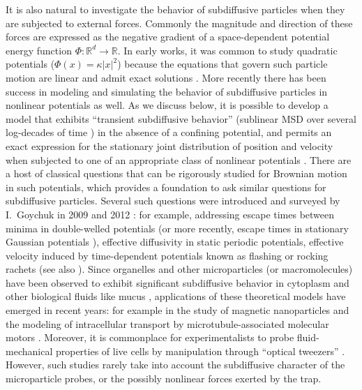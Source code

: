 \documentclass[11pt]{amsart}
\theoremstyle{definition}
\theoremstyle{definition}
\theoremstyle{plain}
\numberwithin{equation}{section}
\begin{document}
It is also natural to investigate the behavior of subdiffusive particles when they are subjected to external forces. Commonly the magnitude and direction of these forces are expressed as the negative gradient of a space-dependent potential energy function $\Phi : \mathbb{R}^d \to \mathbb{R}$. In early works, it was common to study quadratic potentials ($\Phi(x) = \kappa |x|^2$)  because the equations that govern such particle motion are linear and admit exact solutions \cite{adelman1976fokker,kupferman2004fractional,kou2004general}. More recently there has been success in modeling and simulating the behavior of subdiffusive particles in nonlinear potentials as well. As we discuss below, it is possible to develop a model that exhibits ``transient subdiffusive behavior'' (sublinear MSD over several log-decades of time \cite{mckinley2009transient,mckinley2017anomalous}) in the absence of a confining potential, and permits an exact expression for the stationary joint distribution of position and velocity when subjected to one of an appropriate class of nonlinear potentials \cite{ottobre2011asymptotic,goychuk2012viscoelastic,pavliotis2014stochastic}. There are a host of classical questions that can be rigorously studied for Brownian motion in such potentials, which provides a foundation to ask similar questions for subdiffusive particles. Several such questions were introduced and surveyed by I.~Goychuk in 2009 \cite{goychuk2009viscoelastic} and 2012 \cite{goychuk2012viscoelastic}: for example, addressing escape times between minima in double-welled potentials (or more recently, escape times in stationary Gaussian potentials \cite{goychuk2018viscoelastic}), effective diffusivity in static periodic potentials, effective velocity induced by time-dependent potentials known as flashing or rocking rachets (see also \cite{goychuk2010subdiffusive,goychuk2012fractional,kharchenko2012flashing,goychuk2013rocking,kharchenko2013subdiffusive}). Since organelles and other microparticles (or macromolecules) have been observed to exhibit significant subdiffusive behavior in cytoplasm \cite{tolic2004anomalous, weiss2004anomalous,weber2010bacterial} and other biological fluids like mucus \cite{hill2014biophysical}, applications of these theoretical models have emerged in recent years: for example in the study of magnetic nanoparticles \cite{goychuk2015modeling,goychuk2018sensing} and the modeling of intracellular transport by microtubule-associated molecular motors \cite{goychuk2014molecular,goychuk2014moleculartoo,goychuk2015anomalous}. Moreover, it is commonplace for experimentalists to probe fluid-mechanical properties of live cells by manipulation through ``optical tweezers'' \cite{neuman2008single,wei2008comparative,zhang2008optical}. However, such studies rarely take into account the subdiffusive character of the microparticle probes, or the possibly nonlinear forces exerted by the trap.
\end{document}
